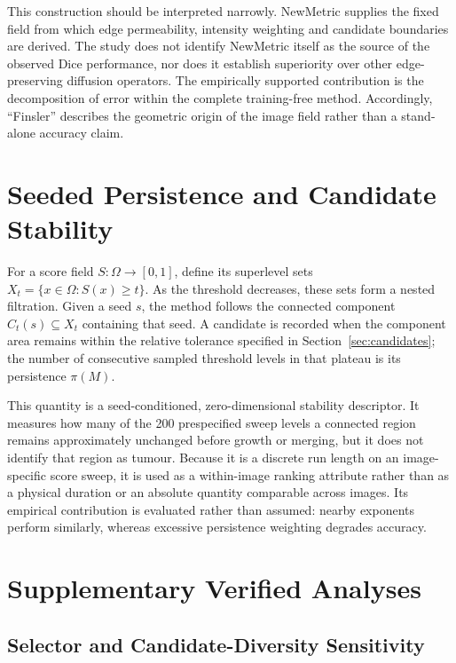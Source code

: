 \documentclass[11pt,a4paper]{article}
\begin{document}
This construction should be interpreted narrowly. NewMetric supplies the fixed
field from which edge permeability, intensity weighting and candidate boundaries
are derived. The study does not identify NewMetric itself as the source of the
observed Dice performance, nor does it establish superiority over other
edge-preserving diffusion operators. The empirically supported contribution is
the decomposition of error within the complete training-free method. Accordingly,
``Finsler'' describes the geometric origin of the image field rather than a
stand-alone accuracy claim.

\section{Seeded Persistence and Candidate Stability}\label{sec:persistence-theory}

For a score field $S:\Omega\rightarrow[0,1]$, define its superlevel sets
$X_t=\{x\in\Omega:S(x)\ge t\}$. As the threshold decreases, these sets form a
nested filtration. Given a seed $s$, the method follows the connected component
$C_t(s)\subseteq X_t$ containing that seed. A candidate is recorded when the
component area remains within the relative tolerance specified in
Section~\ref{sec:candidates}; the number of consecutive sampled threshold
levels in that plateau is its persistence $\pi(M)$.

This quantity is a seed-conditioned, zero-dimensional stability descriptor. It
measures how many of the 200 prespecified sweep levels a connected region remains
approximately unchanged before growth or merging, but it does not identify that
region as tumour. Because it is a discrete run length on an image-specific
score sweep, it is used as a within-image ranking attribute rather than as a
physical duration or an absolute quantity comparable across images. Its
empirical contribution is evaluated rather than assumed: nearby exponents
perform similarly, whereas excessive persistence weighting degrades accuracy.

\section{Supplementary Verified Analyses}\label{sec:appendix-extra}

\subsection{Selector and Candidate-Diversity Sensitivity}
\end{document}
